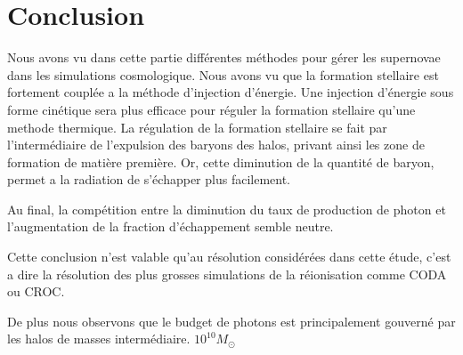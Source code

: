 \section{Conclusion}


Nous avons vu dans cette partie différentes méthodes pour gérer les supernovae dans les simulations cosmologique.
Nous avons vu que la formation stellaire est fortement couplée a la méthode d'injection d'énergie.
Une injection d'énergie sous forme cinétique sera plus efficace pour réguler la formation stellaire qu'une methode thermique.
La régulation de la formation stellaire se fait par l'intermédiaire de l'expulsion des baryons des halos, privant ainsi les zone de formation de matière première.
Or, cette diminution de la quantité de baryon, permet a la radiation de s'échapper plus facilement.

Au final, la compétition entre la diminution du taux de production de photon et l'augmentation de la fraction d'échappement semble neutre.

Cette conclusion n'est valable qu'au résolution considérées dans cette étude, c'est a dire la résolution des plus grosses simulations de la réionisation comme CODA ou CROC. %

De plus nous observons que le budget de photons est principalement gouverné par les halos de masses intermédiaire. $10^{10} M_\odot$







